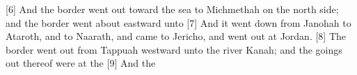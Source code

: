 [6] \textcolor[cmyk]{0.99998,1,0,0}{And the border went out toward the sea to Michmethah on the north side; and the border went about eastward unto  %
[7] \textcolor[cmyk]{0.99998,1,0,0}{And it went down from Janohah to Ataroth, and to Naarath, and came to Jericho, and went out at Jordan.}
[8] \textcolor[cmyk]{0.99998,1,0,0}{The border went out from Tappuah westward unto the river Kanah; and the goings out thereof were at the 
[9] \textcolor[cmyk]{0.99998,1,0,0}{And the  %
}}}
